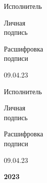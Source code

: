   \parbox{49ex}{
  \parbox{49ex}{
  {\large
  \begin{center}
   Исполнитель\\
  \end{center}
  \vspace{-5ex}
  \begin{center}
   \parbox{20ex}{
    \begin{center}
     Личная\\подпись
    \end{center}
   }
   \parbox{20ex}{
    \begin{center}
     Расшифровка\\подписи
    \end{center}
   }
  \end{center}\vspace{-5ex}
  \begin{center}
   09.04.23
  \end{center}
  }
 }
 \parbox{49ex}{
  {\large
  \begin{center}
   Исполнитель\\
  \end{center}
  \vspace{-5ex}
  \begin{center}
   \parbox{20ex}{
    \begin{center}
     Личная\\подпись
    \end{center}
   }
   \parbox{20ex}{
    \begin{center}
     Расшифровка\\подписи
    \end{center}
   }
  \end{center}\vspace{-5ex}
  \begin{center}
   09.04.23
  \end{center}
  }
 }}
 \begin{center}
  \large{\textbf{2023}}
 \end{center}



